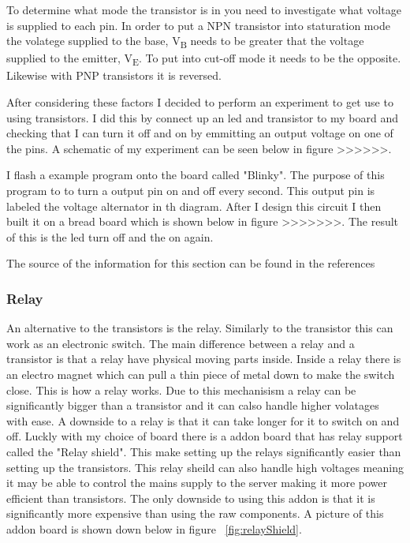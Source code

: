 \documentclass{article}
\begin{document}
To determine what mode the transistor is in you need to investigate what voltage is supplied to each pin.
In order to put a NPN transistor into staturation mode the volatege supplied to the base, V\textsubscript{B}
needs to be greater that the voltage supplied to the emitter, V\textsubscript{E}. To put into cut-off mode
it needs to be the opposite. Likewise with PNP transistors it is reversed.

After considering these factors I decided to perform an experiment to get use to using transistors. I did
this by connect up an led and transistor to my board and checking that I can turn it off and on by emmitting
an output voltage on one of the pins. A schematic of my experiment can be seen below in figure >>>>>>.



I flash a example program onto the board called "Blinky". The purpose of this program to to turn a output
pin on and off every second. This output pin is labeled the voltage alternator in th diagram. After I
design this circuit I then built it on a bread board which is shown below in figure >>>>>>>. The result
of this is the led turn off and the on again.

The source of the information for this section can be found in the references \cite{transistor}

\subsubsection{Relay}

An alternative to the transistors is the relay. Similarly to the transistor this can work as an electronic
switch. The main difference between a relay and a transistor is that a relay have physical moving parts
inside. Inside a relay there is an electro magnet which can pull a thin piece of metal down to make the
switch close. This is how a relay works. Due to this mechanisism a relay can be significantly bigger than
a transistor and it can calso handle higher volatages with ease. A downside to a relay is that it can
take longer for it to switch on and off. Luckly with my choice of board there is a addon board that has
relay support called the "Relay shield"\cite{relaySheild}. This make setting up the relays significantly easier than setting
up the transistors. This relay sheild can also handle high voltages meaning it may be able to control the
mains supply to the server making it more power efficient than transistors. The only downside to using this
addon is that it is significantly more expensive than using the raw components. A picture of this
addon board is shown down below in figure ~\ref{fig:relayShield}.
\end{document}
